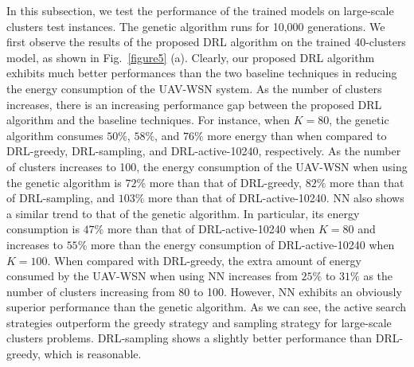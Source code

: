 \documentclass[journal]{IEEEtran}
\begin{document}
In this subsection, we test the performance of the trained models on large-scale clusters test instances. The genetic algorithm runs for 10,000 generations. We first observe the results of the proposed DRL algorithm on the trained 40-clusters model, as shown in Fig.~\ref{figure5} (a). Clearly, our proposed DRL algorithm exhibits much better performances than the two baseline techniques in reducing the energy consumption of the UAV-WSN system. As the number of clusters increases, there is an increasing performance gap between the proposed DRL algorithm and the baseline techniques. For instance, when $K=80$, the genetic algorithm consumes $50\%$, $58\%$, and $76\%$ more energy than when compared to DRL-greedy, DRL-sampling, and DRL-active-10240, respectively. As the number of clusters increases to 100, the energy consumption of the UAV-WSN when using the genetic algorithm is $72\%$ more than that of DRL-greedy, $82\%$ more than that of DRL-sampling, and $103\%$ more than that of DRL-active-10240. NN also shows a similar trend to that of the genetic algorithm. In particular, its energy consumption is $47\%$ more than that of DRL-active-10240 when $K=80$ and increases to $55\%$ more than the energy consumption of DRL-active-10240 when $K=100$. When compared with DRL-greedy, the extra amount of energy consumed by the UAV-WSN when using NN increases from $25\%$  to $31\%$ as the number of clusters increasing from 80 to 100. However, NN exhibits an obviously superior performance than the genetic algorithm.  As we can see, the active search strategies outperform the greedy strategy and sampling strategy for large-scale clusters problems. DRL-sampling shows a slightly better performance than DRL-greedy, which is reasonable.
\end{document}
